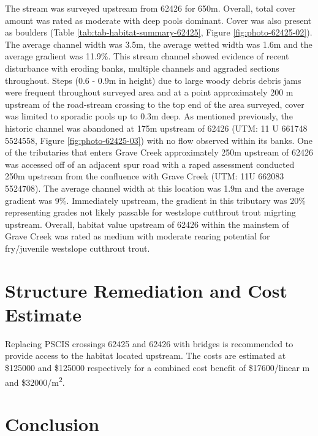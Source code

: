 \documentclass[
]{book}
\begin{document}
The stream was surveyed upstream from 62426 for 650m. Overall, total cover amount was rated as moderate with deep pools dominant. Cover was also present as boulders (Table \ref{tab:tab-habitat-summary-62425}, Figure \ref{fig:photo-62425-02}). The average channel width was 3.5m, the average wetted width was 1.6m and the average gradient was 11.9\%. This stream channel showed evidence of recent disturbance with eroding banks, multiple channels and aggraded sections throughout. Steps (0.6 - 0.9m in height) due to large woody debris debris jams were frequent throughout surveyed area and at a point approximately 200 m upstream of the road-stream crossing to the top end of the area surveyed, cover was limited to sporadic pools up to 0.3m deep. As mentioned previously, the historic channel was abandoned at 175m upstream of 62426 (UTM: 11 U 661748 5524558, Figure \ref{fig:photo-62425-03}) with no flow observed within its banks. One of the tributaries that enters Grave Creek approximately 250m upstream of 62426 was accessed off of an adjacent spur road with a raped assessment conducted 250m upstream from the confluence with Grave Creek (UTM: 11U 662083 5524708). The average channel width at this location was 1.9m and the average gradient was 9\%. Immediately upstream, the gradient in this tributary was 20\% representing grades not likely passable for westslope cutthrout trout migrting upstream. Overall, habitat value upstream of 62426 within the mainstem of Grave Creek was rated as medium with moderate rearing potential for fry/juvenile westslope cutthrout trout.

\hypertarget{structure-remediation-and-cost-estimate-4}{%
\section*{Structure Remediation and Cost Estimate}\label{structure-remediation-and-cost-estimate-4}}

Replacing PSCIS crossings 62425 and 62426 with bridges is recommended to provide access to the habitat located upstream. The costs are estimated at \$125000 and \$125000 respectively for a combined cost benefit of \$17600/linear m and \$32000/m\textsuperscript{2}.

\hypertarget{conclusion-5}{%
\section*{Conclusion}\label{conclusion-5}}
\end{document}
